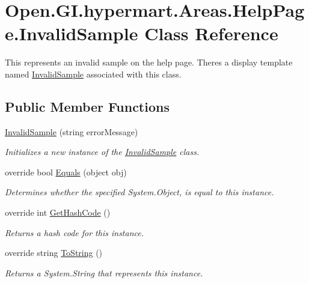 \hypertarget{class_open_1_1_g_i_1_1hypermart_1_1_areas_1_1_help_page_1_1_invalid_sample}{}\section{Open.\+G\+I.\+hypermart.\+Areas.\+Help\+Page.\+Invalid\+Sample Class Reference}
\label{class_open_1_1_g_i_1_1hypermart_1_1_areas_1_1_help_page_1_1_invalid_sample}


This represents an invalid sample on the help page. There\textquotesingle{}s a display template named \hyperlink{class_open_1_1_g_i_1_1hypermart_1_1_areas_1_1_help_page_1_1_invalid_sample}{Invalid\+Sample} associated with this class.  


\subsection*{Public Member Functions}
\begin{DoxyCompactItemize}
\item 
\hyperlink{class_open_1_1_g_i_1_1hypermart_1_1_areas_1_1_help_page_1_1_invalid_sample_a27e0677e2227b94913ea3072e05094b1}{Invalid\+Sample} (string error\+Message)
\begin{DoxyCompactList}\small\item\em Initializes a new instance of the \hyperlink{class_open_1_1_g_i_1_1hypermart_1_1_areas_1_1_help_page_1_1_invalid_sample}{Invalid\+Sample} class. \end{DoxyCompactList}\item 
override bool \hyperlink{class_open_1_1_g_i_1_1hypermart_1_1_areas_1_1_help_page_1_1_invalid_sample_a3c5afe0e3460fccc63bb2b058cf13a8d}{Equals} (object obj)
\begin{DoxyCompactList}\small\item\em Determines whether the specified System.\+Object, is equal to this instance. \end{DoxyCompactList}\item 
override int \hyperlink{class_open_1_1_g_i_1_1hypermart_1_1_areas_1_1_help_page_1_1_invalid_sample_a804d4354478ebcdab08f85e34f138496}{Get\+Hash\+Code} ()
\begin{DoxyCompactList}\small\item\em Returns a hash code for this instance. \end{DoxyCompactList}\item 
override string \hyperlink{class_open_1_1_g_i_1_1hypermart_1_1_areas_1_1_help_page_1_1_invalid_sample_ac19ab8008f61f08252bad6d7c063e7bd}{To\+String} ()
\begin{DoxyCompactList}\small\item\em Returns a System.\+String that represents this instance. \end{DoxyCompactList}\end{DoxyCompactItemize}
